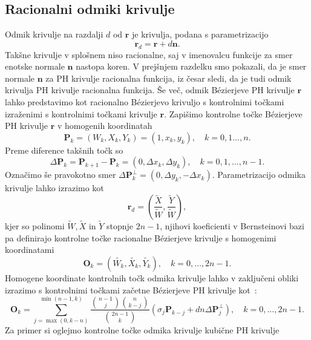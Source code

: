 \documentclass[isrm2, tisk]{fmfdelo}
\newcommand{\mycomment}[1]{\textbf{\textcolor{red}{#1}}}
\begin{document}
    \subsection{Racionalni odmiki krivulje}
    Odmik krivulje na razdalji $d$ od $\mathbf{r}$ je krivulja, podana s parametrizacijo \[\mathbf{r}_d=\mathbf{r} + d\mathbf{n}.\]
    Takšne krivulje v splošnem niso racionalne, saj v imenovalcu funkcije za smer enotske normale $\mathbf{n}$ nastopa koren.
    V prejšnjem razdelku smo pokazali, da je smer normale $\mathbf{n}$ za PH krivulje racionalna funkcija, iz česar sledi, da je tudi odmik krivulja PH krivulje racionalna funkcija.
    Še več, odmik Bézierjeve PH krivulje $\mathbf{r}$ lahko predstavimo kot racionalno Bézierjevo krivuljo s kontrolnimi točkami izraženimi s kontrolnimi točkami krivulje $\mathbf{r}$.
    Zapišimo kontrolne točke Bézierjeve PH krivulje $\mathbf{r}$ v homogenih koordinatah
    \[\mathbf{P}_k = (W_k,X_k,Y_k) = (1,x_k,y_k), \quad k=0,1\ldots,n. \]
    Preme diference takšnih točk so
    \[\Delta\mathbf{P}_k = \mathbf{P}_{k+1}-\mathbf{P}_k = (0,\Delta x_k,\Delta y_k), \quad k=0,1,\ldots,n-1.\]
    Označimo še pravokotno smer $\Delta\mathbf{P}_k^{\perp} =  (0,\Delta y_k, -\Delta x_k)$.
    Parametrizacijo odmika krivulje lahko izrazimo kot
    \[\mathbf{r}_d=\left(\frac{\widetilde{X}}{\widetilde{W}}, \frac{\widetilde{Y}}{\widetilde{W}}\right),\]
    kjer so polinomi $\widetilde{W},\widetilde{X}$ in $\widetilde{Y}$ stopnje $2n-1$,
    njihovi koeficienti v Bernsteinovi bazi pa definirajo kontrolne točke racionalne Bézierjeve krivulje s homogenimi koordinatami
    \[\mathbf{O}_k=(\widetilde{W_k},\widetilde{X_k},\widetilde{Y_k}),\quad k=0,\ldots,2n-1.\]
    Homogene koordinate kontrolnih točk odmika krivulje lahko v zaključeni obliki izrazimo s kontrolnimi točkami začetne Bézierjeve PH krivulje kot~\cite{5389848}:
    \[\mathbf{O}_k= \sum_{j=\max(0,k-n)}^{\min(n-1,k)} \frac{\binom{n-1}{j}\binom{n}{k-j} }{\binom{2n-1}{k}}(\sigma_j\mathbf{P}_{k-j} + dn\Delta \mathbf{P}_j^{\perp}),\quad k=0,\ldots,2n-1.        \]
    Za primer si oglejmo kontrolne točke odmika krivulje kubične PH krivulje
\end{document}
